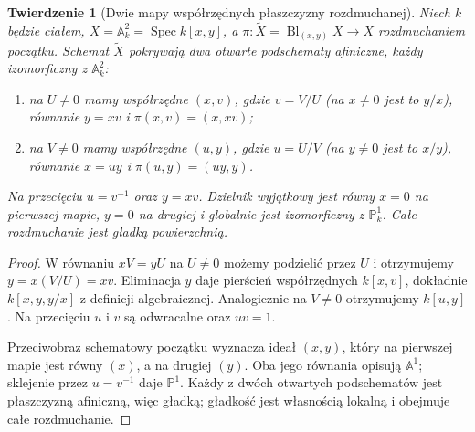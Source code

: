 \documentclass[11pt,a4paper,openany]{report}
\numberwithin{equation}{section}
\theoremstyle{plain}
\newtheorem{twierdzenie}{Twierdzenie}[section]
\theoremstyle{definition}
\theoremstyle{remark}
\newcommand{\A}{\mathbb A}
\newcommand{\PP}{\mathbb P}
\newcommand{\Spec}{\operatorname{Spec}}
\begin{document}
\begin{twierdzenie}[Dwie mapy współrzędnych płaszczyzny rozdmuchanej]
\label{tw:ga5-plane-charts}
Niech $k$ będzie ciałem, $X=\A^2_k=\Spec k[x,y]$,
a $\pi:\widetilde X=\operatorname{Bl}_{(x,y)}X\to X$
rozdmuchaniem początku. Schemat $\widetilde X$ pokrywają
dwa otwarte podschematy afiniczne, każdy izomorficzny z
$\A^2_k$:
\begin{enumerate}[label=(\roman*)]
\item na $U\ne0$ mamy współrzędne $(x,v)$, gdzie
$v=V/U$ (na $x\ne0$ jest to $y/x$), równanie $y=xv$ i
$\pi(x,v)=(x,xv)$;
\item na $V\ne0$ mamy współrzędne $(u,y)$, gdzie
$u=U/V$ (na $y\ne0$ jest to $x/y$), równanie $x=uy$ i
$\pi(u,y)=(uy,y)$.
\end{enumerate}
Na przecięciu $u=v^{-1}$ oraz $y=xv$.
Dzielnik wyjątkowy jest równy $x=0$ na pierwszej
mapie, $y=0$ na drugiej i globalnie jest izomorficzny
z $\PP^1_k$. Całe rozdmuchanie jest gładką powierzchnią.
\end{twierdzenie}
\begin{proof}
W równaniu $xV=yU$ na $U\ne0$ możemy podzielić przez
$U$ i otrzymujemy $y=x(V/U)=xv$. Eliminacja $y$
daje pierścień współrzędnych $k[x,v]$, dokładnie
$k[x,y,y/x]$ z definicji algebraicznej. Analogicznie
na $V\ne0$ otrzymujemy $k[u,y]$. Na przecięciu
$u$ i $v$ są odwracalne oraz $uv=1$.

Przeciwobraz schematowy początku wyznacza ideał
$(x,y)$, który na pierwszej mapie jest równy $(x)$,
a na drugiej $(y)$. Oba jego równania opisują
$\A^1$; sklejenie przez $u=v^{-1}$ daje $\PP^1$.
Każdy z dwóch otwartych podschematów jest płaszczyzną afiniczną, więc gładką;
gładkość jest własnością lokalną i obejmuje całe
rozdmuchanie.
\end{proof}
\end{document}
